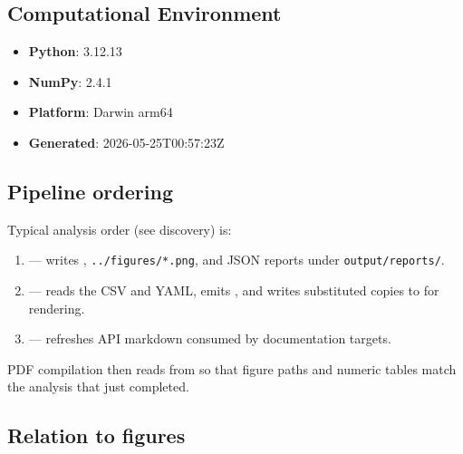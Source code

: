 \documentclass[
]{article}
\providecommand{\tightlist}{%
  \setlength{\itemsep}{0pt}\setlength{\parskip}{0pt}}
\begin{document}
\subsection{Computational Environment}\label{computational-environment}

\begin{itemize}
\tightlist
\item
  \textbf{Python}: 3.12.13
\item
  \textbf{NumPy}: 2.4.1
\item
  \textbf{Platform}: Darwin arm64
\item
  \textbf{Generated}: 2026-05-25T00:57:23Z
\end{itemize}

\subsection{Pipeline ordering}\label{pipeline-ordering}

Typical  analysis order (see
 discovery) is:

\begin{enumerate}
\def\labelenumi{\arabic{enumi}.}
\tightlist
\item
   --- writes
  ,
  \texttt{../figures/*.png}, and JSON reports under
  \texttt{output/reports/}.
\item
   --- reads the CSV and
  YAML, emits , and
  writes substituted copies to  for
  rendering.
\item
   --- refreshes API markdown consumed by
  documentation targets.
\end{enumerate}

PDF compilation then reads from  so that
figure paths and numeric tables match the analysis that just completed.

\subsection{Relation to figures}\label{relation-to-figures}
\end{document}
